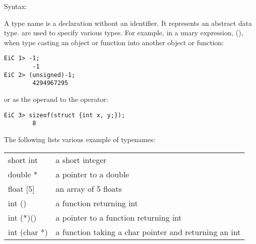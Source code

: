 Syntax:
\begin{production}
\end{production}


A type name is a declaration without an identifier. It represents an
abstract data type.  are
used to specify various types. For example, in a unary expression,
(), when
 type casting an object or function into another object or
function:
\begin{production}
\begin{verbatim}
EiC 1> -1;
        -1
EiC 2> (unsigned)-1;
        4294967295
\end{verbatim}
\end{production}
 or  as the operand to the  operator:
\begin{production}
\begin{verbatim}
EiC 3> sizeof(struct {int x, y;});
        8
\end{verbatim}
\end{production}

The following lists various example of typenames:

\small
\begin{center}
\begin{tabular}{ll}
short int   &  a short integer \\
double *    &  a pointer to a double  \\   
float [5]   &  an array of 5 floats\\
int  ()     &  a function returning int\\
int (*)()   &  a pointer to a function returning int\\
int  (char *) & a function taking a char pointer and returning an int
\end{tabular}
\end{center}
\normalsize


